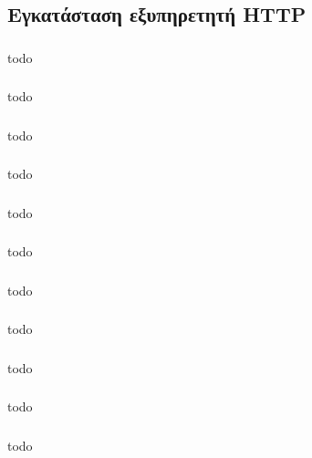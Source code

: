 \documentclass[a4paper, 12pt]{article}
\begin{document}
	\subsection{Εγκατάσταση εξυπηρετητή HTTP}

		\subsubsection{}
			todo

		\subsubsection{}
			todo

		\subsubsection{}
			todo

		\subsubsection{}
			todo

		\subsubsection{}
			todo

		\subsubsection{}
			todo

		\subsubsection{}
			todo

		\subsubsection{}
			todo

		\subsubsection{}
			todo

		\subsubsection{}
			todo

		\subsubsection{}
			todo
\end{document}
